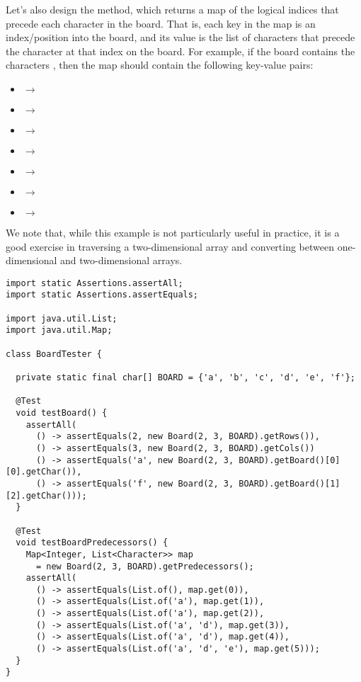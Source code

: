 Let's also design the  method, which returns a map of the logical indices that precede each character in the board.
That is, each key in the map is an index/position into the board, and its value is the list of characters that precede the character at that index on the board.
For example, if the board contains the characters , then the map should contain the following key-value pairs:

\begin{itemize}
  \item {} $\rightarrow$ \ttt{[]}
  \item {} $\rightarrow$ \ttt{['a']}
  \item {} $\rightarrow$ \ttt{['a']}
  \item {} $\rightarrow$ \ttt{['a', 'e']}
  \item {} $\rightarrow$ \ttt{['a', 'e']}
  \item {} $\rightarrow$ \ttt{['a', 'e', 'f']}
  \item {} $\rightarrow$ \ttt{['a', 'e', 'f']}
\end{itemize}

We note that, while this example is not particularly useful in practice, it is a good exercise in traversing a two-dimensional array and converting between one-dimensional and two-dimensional arrays.

\begin{lstlisting}[language=MyJava]
import static Assertions.assertAll;
import static Assertions.assertEquals;

import java.util.List;
import java.util.Map;

class BoardTester {

  private static final char[] BOARD = {'a', 'b', 'c', 'd', 'e', 'f'};

  @Test
  void testBoard() {
    assertAll(
      () -> assertEquals(2, new Board(2, 3, BOARD).getRows()),
      () -> assertEquals(3, new Board(2, 3, BOARD).getCols())
      () -> assertEquals('a', new Board(2, 3, BOARD).getBoard()[0][0].getChar()),
      () -> assertEquals('f', new Board(2, 3, BOARD).getBoard()[1][2].getChar()));
  }

  @Test
  void testBoardPredecessors() {
    Map<Integer, List<Character>> map 
      = new Board(2, 3, BOARD).getPredecessors();
    assertAll(
      () -> assertEquals(List.of(), map.get(0)),
      () -> assertEquals(List.of('a'), map.get(1)),
      () -> assertEquals(List.of('a'), map.get(2)),
      () -> assertEquals(List.of('a', 'd'), map.get(3)),
      () -> assertEquals(List.of('a', 'd'), map.get(4)),
      () -> assertEquals(List.of('a', 'd', 'e'), map.get(5)));
  }
}
\end{lstlisting}

